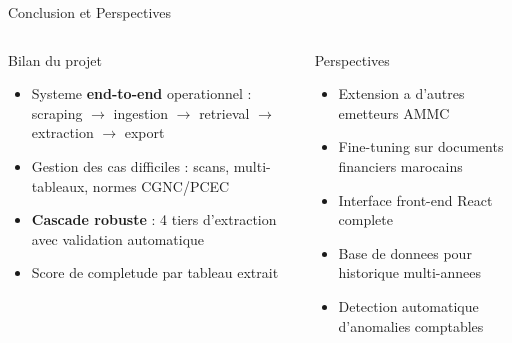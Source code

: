 \documentclass[aspectratio=169, 10pt]{beamer}
\begin{document}
\begin{frame}{Conclusion et Perspectives}
  \begin{columns}[T]
      \begin{block}{Bilan du projet}
        \begin{itemize}\small
          \item Systeme \textbf{end-to-end} operationnel :\\
                scraping $\to$ ingestion $\to$ retrieval
                $\to$ extraction $\to$ export
          \item Gestion des cas difficiles : scans,
                multi-tableaux, normes CGNC/PCEC
          \item \textbf{Cascade robuste} : 4 tiers d'extraction
                avec validation automatique
          \item Score de completude par tableau extrait
        \end{itemize}
      \end{block}

      \begin{alertblock}{Perspectives}
        \begin{itemize}\small
          \item Extension a d'autres emetteurs AMMC
          \item Fine-tuning sur documents financiers marocains
          \item Interface front-end React complete
          \item Base de donnees pour historique multi-annees
          \item Detection automatique d'anomalies comptables
        \end{itemize}
      \end{alertblock}
  \end{columns}

  \vspace{0.4cm}
  \centering
\end{frame}
\end{document}
